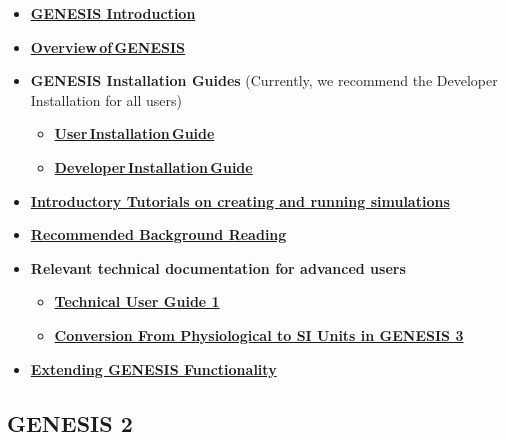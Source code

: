 \documentclass[12pt]{article}
\begin{document}
\begin{itemize}

   \item \href{../genesis-intro/genesis-intro.tex} {\bf GENESIS Introduction}

   \item \href{../genesis-overview/genesis-overview.tex}{\bf Overview\,of\,GENESIS}

   \item {\bf GENESIS Installation Guides} (Currently, we recommend the Developer Installation for all users)

      \begin{itemize}
         \item \href{../installation-debian/installation-debian.tex}{\bf User\,Installation\,Guide}
         \item \href{../developer-installation/developer-installation.tex}{\bf Developer\,Installation\,Guide}
      \end{itemize}

   \item \href{../tutorial-genesis/tutorial-genesis.tex} {\bf Introductory
          Tutorials on creating and running simulations}

   \item \href{../background-material/background-material.tex}
          {\bf Recommended Background Reading}

    \item  {\bf Relevant technical documentation for advanced users}
      \begin{itemize}
         \item \href{../technical-guide-1/technical-guide-1.tex}
                {\bf Technical User Guide 1}
         \item \href{../units-conversion/units-conversion.tex}
                {\bf Conversion From Physiological to SI Units in GENESIS 3}
      \end{itemize}

    \item \href{../genesis-extend-functionality/genesis-extend-functionality.tex}
          {\bf Extending GENESIS Functionality}
\end{itemize}

\subsection*{GENESIS 2}
\end{document}
